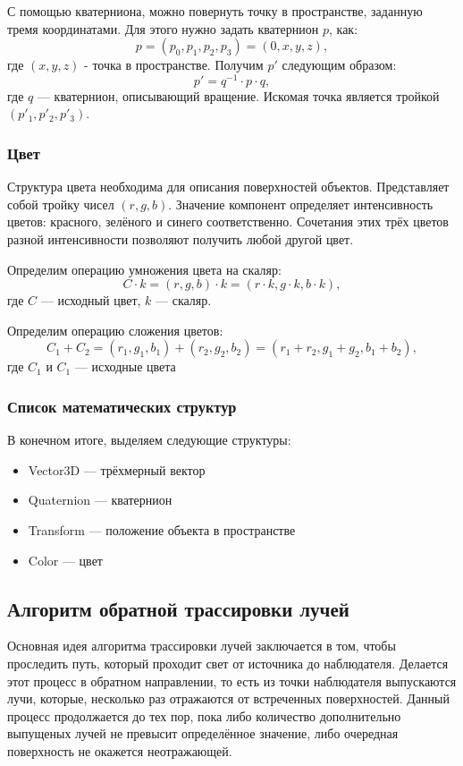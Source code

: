 С помощью кватерниона, можно повернуть точку в пространстве, заданную тремя координатами. Для этого нужно задать кватернион $p$, как:
\begin{equation}
	p=(p_0,p_1,p_2,p_3)=(0, x, y, z),
\end{equation}
где $(x, y, z)$ - точка в пространстве. Получим $p'$ следующим образом:
\begin{equation}
	p'=q^{-1}\cdot p\cdot q,
\end{equation}
где $q$ --- кватернион, описывающий вращение. Искомая точка является тройкой $(p'_1, p'_2, p'_3)$.

\subsubsection{Цвет}
Структура цвета необходима для описания поверхностей объектов. Представляет собой тройку чисел $(r, g, b)$. Значение компонент определяет интенсивность цветов: красного, зелёного и синего соответственно. Сочетания этих трёх цветов разной интенсивности позволяют получить любой другой цвет.

Определим операцию умножения цвета на скаляр:
\begin{equation}
	C\cdot k=(r, g, b)\cdot k=(r\cdot k, g\cdot k, b\cdot k),
\end{equation}
где $C$ --- исходный цвет, $k$ --- скаляр.

Определим операцию сложения цветов:
\begin{equation}
	C_1+C_2=(r_1, g_1, b_1)+(r_2, g_2, b_2)=(r_1+r_2,g_1+g_2,b_1+b_2),
\end{equation}
где $C_1$ и $C_1$ --- исходные цвета

\subsubsection{Список математических структур}
В конечном итоге, выделяем следующие структуры:
\begin{itemize}
	\item Vector3D --- трёхмерный вектор
	\item Quaternion --- кватернион
	\item Transform --- положение объекта в пространстве
	\item Color --- цвет
\end{itemize}

\subsection{Алгоритм обратной трассировки лучей}
Основная идея алгоритма трассировки лучей заключается в том, чтобы проследить путь, который проходит свет от источника до наблюдателя. Делается этот процесс в обратном направлении, то есть из точки наблюдателя выпускаются лучи, которые, несколько раз отражаются от встреченных поверхностей. Данный процесс продолжается до тех пор, пока либо количество дополнительно выпущеных лучей не превысит определённое значение, либо очередная поверхность не окажется неотражающей.

